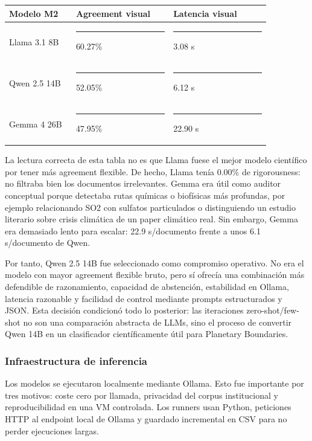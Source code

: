 \begin{center}
\scriptsize
\setlength{\tabcolsep}{5pt}
\renewcommand{\arraystretch}{1.2}
\begin{tabular}{p{0.22\linewidth}p{0.32\linewidth}p{0.32\linewidth}}
\toprule
Modelo M2 & Agreement visual & Latencia visual \\
\midrule
Llama 3.1 8B & \rule{3.50cm}{0.8ex} 60.27\% & \rule{0.51cm}{0.8ex} 3.08 s \\
Qwen 2.5 14B & \rule{3.02cm}{0.8ex} 52.05\% & \rule{1.02cm}{0.8ex} 6.12 s \\
Gemma 4 26B & \rule{2.78cm}{0.8ex} 47.95\% & \rule{3.80cm}{0.8ex} 22.90 s \\
\bottomrule
\end{tabular}
\end{center}

La lectura correcta de esta tabla no es que Llama fuese el mejor modelo científico por tener más agreement flexible. De hecho, Llama tenía 0.00\% de rigorousness: no filtraba bien los documentos irrelevantes. Gemma era útil como auditor conceptual porque detectaba rutas químicas o biofísicas más profundas, por ejemplo relacionando SO2 con sulfatos particulados o distinguiendo un estudio literario sobre crisis climática de un paper climático real. Sin embargo, Gemma era demasiado lento para escalar: 22.9 s/documento frente a unos 6.1 s/documento de Qwen.

Por tanto, Qwen 2.5 14B fue seleccionado como compromiso operativo. No era el modelo con mayor agreement flexible bruto, pero sí ofrecía una combinación más defendible de razonamiento, capacidad de abstención, estabilidad en Ollama, latencia razonable y facilidad de control mediante prompts estructurados y JSON. Esta decisión condicionó todo lo posterior: las iteraciones zero-shot/few-shot no son una comparación abstracta de LLMs, sino el proceso de convertir Qwen 14B en un clasificador científicamente útil para Planetary Boundaries.

\subsubsection*{Infraestructura de inferencia}

Los modelos se ejecutaron localmente mediante Ollama. Esto fue importante por tres motivos: coste cero por llamada, privacidad del corpus institucional y reproducibilidad en una VM controlada. Los runners usan Python, peticiones HTTP al endpoint local de Ollama y guardado incremental en CSV para no perder ejecuciones largas.

